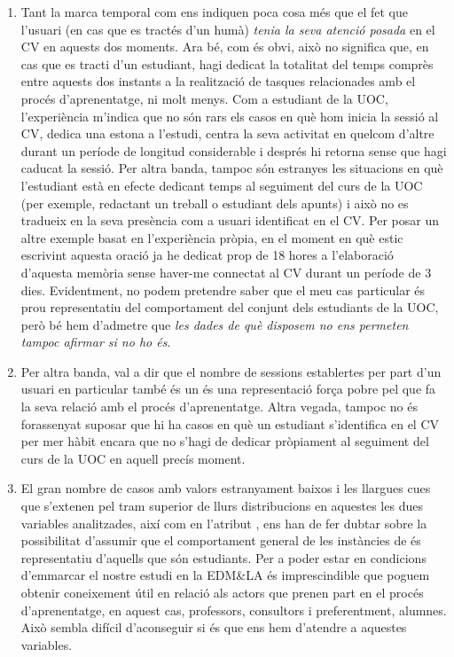 \documentclass[
	a4paper,
	twoside,
	justified
]{tufte-book}
\begin{document}
\begin{enumerate}[(1)]

\item Tant la marca temporal  com  ens indiquen poca cosa més que el fet que l'usuari (en cas que es tractés d'un humà) \emph{tenia la seva atenció posada} en el CV en aquests dos moments. Ara bé, com és obvi, això no significa que, en cas que es tracti d'un estudiant, hagi dedicat la totalitat del temps comprès entre aquests dos instants a la realització de tasques relacionades amb el procés d'aprenentatge, ni molt menys. Com a estudiant de la UOC, l'experiència m'indica que no són rars els casos en què hom inicia la sessió al CV, dedica una estona a l'estudi, centra la seva activitat en quelcom d'altre durant un període de longitud considerable i després hi retorna sense que hagi caducat la sessió. Per altra banda, tampoc són estranyes les situacions en què l'estudiant està en efecte dedicant temps al seguiment del curs de la UOC (per exemple, redactant un treball o estudiant dels apunts) i això no es tradueix en la seva presència com a usuari identificat en el CV. Per posar un altre exemple basat en l'experiència pròpia, en el moment en què estic escrivint aquesta oració ja he dedicat prop de 18 hores a l'elaboració d'aquesta memòria sense haver-me connectat al CV durant un període de 3 dies. Evidentment, no podem pretendre saber que el meu cas particular és prou representatiu del comportament del conjunt dels estudiants de la UOC, però bé hem d'admetre que \emph{les dades de què disposem no ens permeten tampoc afirmar si no ho és}.     

\item Per altra banda, val a dir que el nombre de sessions establertes per part d'un usuari en particular també és un és una representació força pobre pel que fa la seva relació amb el procés d'aprenentatge. Altra vegada, tampoc no és forassenyat suposar que hi ha casos en què un estudiant s'identifica en el CV per mer hàbit encara que no s'hagi de dedicar pròpiament al seguiment del curs de la UOC en aquell precís moment.     

\item El gran nombre de casos amb valors estranyament baixos i les llargues cues que s'extenen pel tram superior de llurs distribucions en aquestes les dues variables analitzades, així com en l'atribut , ens han de fer dubtar sobre la possibilitat d'assumir que el comportament general de les instàncies de  és representatiu d'aquells que són estudiants. Per a poder estar en condicions d'emmarcar el nostre estudi en la EDM\&LA és imprescindible que poguem obtenir coneixement útil en relació als actors que prenen part en el procés d'aprenentatge, en aquest cas, professors, consultors i preferentment, alumnes. Això sembla difícil d'aconseguir si és que ens hem d'atendre a aquestes variables.


\end{enumerate}
\end{document}

